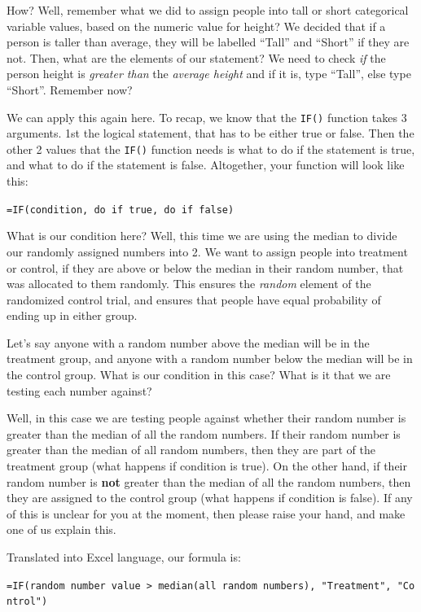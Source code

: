\documentclass[
]{book}
\begin{document}
How? Well, remember what we did to assign people into tall or short categorical variable values, based on the numeric value for height? We decided that if a person is taller than average, they will be labelled ``Tall'' and ``Short'' if they are not. Then, what are the elements of our statement? We need to check \emph{if} the person height is \emph{greater than} the \emph{average height} and if it is, type ``Tall'', else type ``Short''. Remember now?

We can apply this again here. To recap, we know that the \texttt{IF()} function takes 3 arguments. 1st the logical statement, that has to be either true or false. Then the other 2 values that the \texttt{IF()} function needs is what to do if the statement is true, and what to do if the statement is false.
Altogether, your function will look like this:

\texttt{=IF(condition,\ do\ if\ true,\ do\ if\ false)}

What is our condition here? Well, this time we are using the median to divide our randomly assigned numbers into 2. We want to assign people into treatment or control, if they are above or below the median in their random number, that was allocated to them randomly. This ensures the \emph{random} element of the randomized control trial, and ensures that people have equal probability of ending up in either group.

Let's say anyone with a random number above the median will be in the treatment group, and anyone with a random number below the median will be in the control group. What is our condition in this case? What is it that we are testing each number against?

Well, in this case we are testing people against whether their random number is greater than the median of all the random numbers. If their random number is greater than the median of all random numbers, then they are part of the treatment group (what happens if condition is true). On the other hand, if their random number is \textbf{not} greater than the median of all the random numbers, then they are assigned to the control group (what happens if condition is false). If any of this is unclear for you at the moment, then please raise your hand, and make one of us explain this.

Translated into Excel language, our formula is:

\texttt{=IF(random\ number\ value\ \textgreater{}\ median(all\ random\ numbers),\ "Treatment",\ "Control")}
\end{document}
